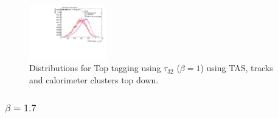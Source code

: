 \begin{figure}[H]
\includegraphics[width=0.3\textwidth]{sascha_input/Appendix/Distributions/top/distributions/beta1/h_recoJet_nSub32_bin6.pdf}
\vspace{-0.75cm}
\caption{{Distributions for Top tagging using $\tau_{32}$ ($\beta=1$) using TAS, tracks and calorimeter clusters top down.}}
\end{figure}

\subsubsection*{$\beta=1.7$}
